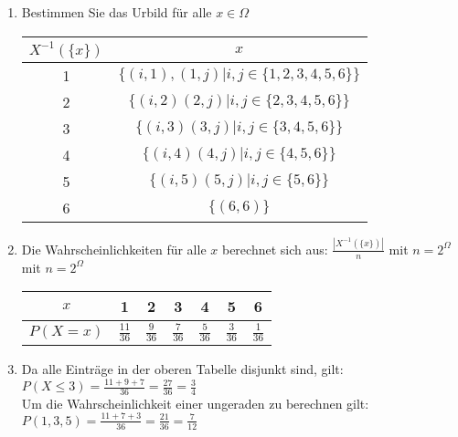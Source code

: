 \begin{enumerate}
	\item Bestimmen Sie das Urbild für alle $ x \in \Omega $  \\
		\begin{tabular}{|c|c|}
		\hline
		$X^{-1}(\{x\}) $ & $x$ \\ \hline
		1 & $\{(i,1), (1,j) | i,j \in \{1,2,3,4,5,6\} \}$ \\ \hline
		2 & $\{(i, 2) (2,j) | i,j \in \{2,3,4,5,6 \} \}$ \\ \hline 
		3 & $\{(i, 3) (3,j) | i,j \in \{3,4,5,6 \} \}$ \\ \hline
 		4 & $\{(i, 4) (4,j) | i,j \in \{4,5,6 \} \}$ \\ \hline 	
		5 & $\{(i, 5) (5,j) | i,j \in \{5,6 \} \}$ \\ \hline 	
		6 & $\{(6,6) \}$ \\ \hline 
		\end{tabular}
	\item 	Die Wahrscheinlichkeiten für alle $x$ berechnet sich aus: $ \frac{|X^{-1}(\{x\})|}{n} $ mit $n = 2^{\Omega}$ mit $n = 2^{\Omega}$ \\
		\begin{tabular}{|c|c|c|c|c|c|c|}
		\hline
		$x$  & 1& 2& 3& 4& 5& 6 \\ \hline
		$P(X=x)$ & $ \frac{11}{36}$ & $\frac{9}{36}$& $\frac{7}{36}$& $\frac{5}{36}$& $\frac{3}{36}$& $\frac{1}{36}$ \\ \hline
		\end{tabular}
	\item 	Da alle Einträge in der oberen Tabelle disjunkt sind, gilt:  $P(X \leq 3)=\frac{11+9+7}{36}=\frac{27}{36}=\frac{3}{4}$ \\
		Um die Wahrscheinlichkeit einer ungeraden zu berechnen gilt: $P({1,3,5})= \frac{11 + 7 +3}{36}  =  \frac{21}{36}=\frac{7}{12}$ \\

\end{enumerate}
